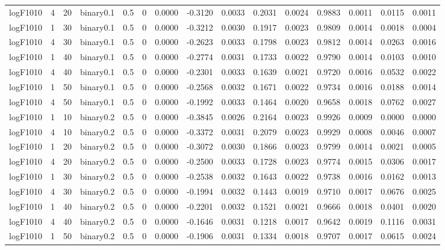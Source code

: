 \begin{longtable}{rrrrrrrrrrrrrrr}
  logF1010 & 4 & 20 & binary0.1 & 0.5 & 0 & 0.0000 & -0.3120 & 0.0033 & 0.2031 & 0.0024 & 0.9883 & 0.0011 & 0.0115 & 0.0011 \\ 
  logF1010 & 1 & 30 & binary0.1 & 0.5 & 0 & 0.0000 & -0.3212 & 0.0030 & 0.1917 & 0.0023 & 0.9809 & 0.0014 & 0.0018 & 0.0004 \\ 
  logF1010 & 4 & 30 & binary0.1 & 0.5 & 0 & 0.0000 & -0.2623 & 0.0033 & 0.1798 & 0.0023 & 0.9812 & 0.0014 & 0.0263 & 0.0016 \\ 
  logF1010 & 1 & 40 & binary0.1 & 0.5 & 0 & 0.0000 & -0.2774 & 0.0031 & 0.1733 & 0.0022 & 0.9790 & 0.0014 & 0.0103 & 0.0010 \\ 
  logF1010 & 4 & 40 & binary0.1 & 0.5 & 0 & 0.0000 & -0.2301 & 0.0033 & 0.1639 & 0.0021 & 0.9720 & 0.0016 & 0.0532 & 0.0022 \\ 
  logF1010 & 1 & 50 & binary0.1 & 0.5 & 0 & 0.0000 & -0.2568 & 0.0032 & 0.1671 & 0.0022 & 0.9734 & 0.0016 & 0.0188 & 0.0014 \\ 
  logF1010 & 4 & 50 & binary0.1 & 0.5 & 0 & 0.0000 & -0.1992 & 0.0033 & 0.1464 & 0.0020 & 0.9658 & 0.0018 & 0.0762 & 0.0027 \\ 
  logF1010 & 1 & 10 & binary0.2 & 0.5 & 0 & 0.0000 & -0.3845 & 0.0026 & 0.2164 & 0.0023 & 0.9926 & 0.0009 & 0.0000 & 0.0000 \\ 
  logF1010 & 4 & 10 & binary0.2 & 0.5 & 0 & 0.0000 & -0.3372 & 0.0031 & 0.2079 & 0.0023 & 0.9929 & 0.0008 & 0.0046 & 0.0007 \\ 
  logF1010 & 1 & 20 & binary0.2 & 0.5 & 0 & 0.0000 & -0.3072 & 0.0030 & 0.1866 & 0.0023 & 0.9799 & 0.0014 & 0.0021 & 0.0005 \\ 
  logF1010 & 4 & 20 & binary0.2 & 0.5 & 0 & 0.0000 & -0.2500 & 0.0033 & 0.1728 & 0.0023 & 0.9774 & 0.0015 & 0.0306 & 0.0017 \\ 
  logF1010 & 1 & 30 & binary0.2 & 0.5 & 0 & 0.0000 & -0.2538 & 0.0032 & 0.1643 & 0.0022 & 0.9738 & 0.0016 & 0.0162 & 0.0013 \\ 
  logF1010 & 4 & 30 & binary0.2 & 0.5 & 0 & 0.0000 & -0.1994 & 0.0032 & 0.1443 & 0.0019 & 0.9710 & 0.0017 & 0.0676 & 0.0025 \\ 
  logF1010 & 1 & 40 & binary0.2 & 0.5 & 0 & 0.0000 & -0.2201 & 0.0032 & 0.1521 & 0.0021 & 0.9666 & 0.0018 & 0.0401 & 0.0020 \\ 
  logF1010 & 4 & 40 & binary0.2 & 0.5 & 0 & 0.0000 & -0.1646 & 0.0031 & 0.1218 & 0.0017 & 0.9642 & 0.0019 & 0.1116 & 0.0031 \\ 
  logF1010 & 1 & 50 & binary0.2 & 0.5 & 0 & 0.0000 & -0.1906 & 0.0031 & 0.1334 & 0.0018 & 0.9707 & 0.0017 & 0.0615 & 0.0024 \\ 

\end{longtable}
